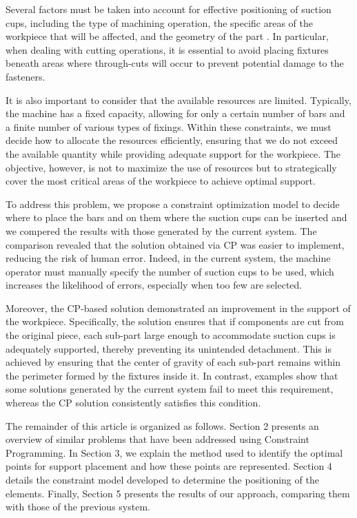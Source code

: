 \documentclass[runningheads]{llncs}
\begin{document}
Several factors must be taken into account for effective positioning of suction cups, including the type of machining operation, the specific areas of the workpiece that will be affected, and the geometry of the part \cite{rachierumethodology}. In particular, when dealing with cutting operations, it is essential to avoid placing fixtures beneath areas where through-cuts will occur to prevent potential damage to the fasteners.

It is also important to consider that the available resources are limited. Typically, the machine has a fixed capacity, allowing for only a certain number of bars and a finite number of various types of fixings. Within these constraints, we must decide how to allocate the resources efficiently, ensuring that we do not exceed the available quantity while providing adequate support for the workpiece. The objective, however, is not to maximize the use of resources but to strategically cover the most critical areas of the workpiece to achieve optimal support.

To address this problem, we propose a constraint optimization model to decide where to place the bars and on them where the suction cups can be inserted and we compered the results with those generated by the current system. The comparison revealed that the solution obtained via CP was easier to implement, reducing the risk of human error. Indeed, in the current system, the machine operator must manually specify the number of suction cups to be used, which increases the likelihood of errors, especially when too few are selected.

Moreover, the CP-based solution demonstrated an improvement in the support of the workpiece. Specifically, the solution ensures that if components are cut from the original piece, each sub-part large enough to accommodate suction cups is adequately supported, thereby preventing its unintended detachment. This is achieved by ensuring that the center of gravity of each sub-part remains within the perimeter formed by the fixtures inside it. In contrast, examples show that some solutions generated by the current system fail to meet this requirement, whereas the CP solution consistently satisfies this condition.

The remainder of this article is organized as follows. Section 2 presents an overview of similar problems that have been addressed using Constraint Programming. In Section 3, we explain the method used to identify the optimal points for support placement and how these points are represented. Section 4 details the constraint model developed to determine the positioning of the elements. Finally, Section 5 presents the results of our approach, comparing them with those of the previous system.
\end{document}
